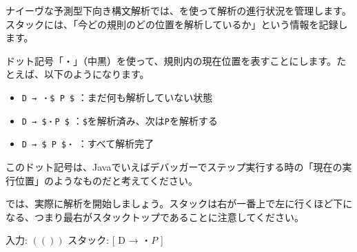 ナイーヴな予測型下向き構文解析では、を使って解析の進行状況を管理します。スタックには、「今どの規則のどの位置を解析しているか」という情報を記録します。

ドット記号「・」（中黒）を使って、規則内の現在位置を表すことにします。たとえば、以下のようになります。

\begin{itemize}
\item
  \texttt{D\ →\ ・\$\ P\ \$} ：まだ何も解析していない状態
\item
  \texttt{D\ →\ \$・P\ \$}
  ：\texttt{\$}を解析済み、次は\texttt{P}を解析する
\item
  \texttt{D\ →\ \$\ P\ \$・} ：すべて解析完了
\end{itemize}

このドット記号は、Javaでいえばデバッガーでステップ実行する時の「現在の実行位置」のようなものだと考えてください。

では、実際に解析を開始しましょう。スタックは右が一番上で左に行くほど下になる、つまり最右がスタックトップであることに注意してください。

\begin{codescreen}{}
入力: $ ( ( ) ) $
スタック: [ D → ・$ P $ ]
\end{codescreen}

